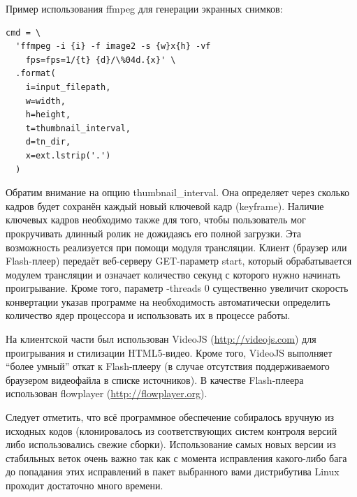 \FloatBarrier

Пример использования ffmpeg для генерации экранных снимков:
\begin{verbatim}
cmd = \
  'ffmpeg -i {i} -f image2 -s {w}x{h} -vf
    fps=fps=1/{t} {d}/\%04d.{x}' \
  .format(
    i=input_filepath,
    w=width,
    h=height,
    t=thumbnail_interval,
    d=tn_dir,
    x=ext.lstrip('.')
  )
\end{verbatim}

Обратим внимание на опцию thumbnail\_interval. Она определяет через сколько кадров будет сохранён каждый новый
ключевой кадр (keyframe). Наличие ключевых кадров необходимо также для того, чтобы пользователь мог прокручивать
длинный ролик не дожидаясь его полной загрузки. Эта возможность реализуется при помощи модуля трансляции.
Клиент (браузер или Flash-плеер) передаёт веб-серверу GET-параметр start, который обрабатывается модулем трансляции
и означает количество секунд с которого нужно начинать проигрывание. Кроме того, параметр -threads 0 существенно
увеличит скорость конвертации указав программе на необходимость автоматически определить количество ядер
процессора и использовать их в процессе работы.

На клиентской части был использован VideoJS (\url{http://videojs.com}) для проигрывания и стилизации HTML5-видео.
Кроме того, VideoJS выполняет “более умный” откат к Flash-плееру (в случае отсутствия поддерживаемого браузером видеофайла
в списке источников). В качестве Flash-плеера использован flowplayer (\url{http://flowplayer.org}).

Следует отметить, что всё программное обеспечение собиралось вручную из исходных кодов (клонировалось из соответствующих
систем контроля версий либо использовались свежие сборки). Использование самых новых версии из стабильных веток очень важно
так как с момента исправления какого-либо бага до попадания этих исправлений в пакет выбранного вами дистрибутива Linux
проходит достаточно много времени.
